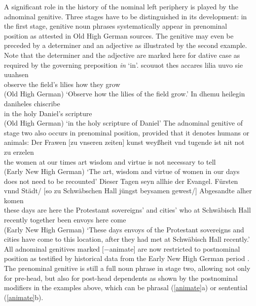 \documentclass[output=paper
                ,modfonts
                ,nonflat
	        ,collection
	        ,collectionchapter
	        ,collectiontoclongg
 	        ,biblatex
                ,babelshorthands
                ,newtxmath
                ,draftmode
                ,colorlinks, citecolor=brown
]{./langsci/langscibook}
\begin{document}
A significant role in the history of the nominal left periphery is played by the adnominal genitive. Three stages have to be distinguished in its development: in the first stage, genitive noun phrases systematically appear in prenominal position as attested in Old High German sources. The genitive may even be preceded by a determiner and an adjective as illustrated by the second example. Note that the determiner and the adjective are marked here for dative case as required by the governing preposition \textit{in} `in'.
\eal
\ex 
\gll scouuot thes accares lilia uuvo sie uuahsen \\ observe the field's lilies how they grow \\  \hfill (Old High German)
\glt `Observe how the lilies of the field grow.'
\ex 
\gll In dhemu heilegin daniheles chiscribe \\ in the holy Daniel's scripture  \\  \hfill (Old High German)
\glt `in the holy scripture of Daniel'
\zl
The adnominal genitive of stage two also occurs in prenominal position, provided that it denotes humans or animals:
\eal \label{animate}
\ex 
\gll Der Frawen [zu vnseren zeiten] kunst weyßheit vnd tugende ist nit not zu erzelen \\  the women at our times art wisdom and virtue is not necessary to tell  \\  \hfill (Early New High German)
\glt `The art, wisdom and virtue of women in our days does not need to be recounted'
\ex 
\gll Dieser Tagen seyn allhie der Evangel. Fürsten vnnd Städt/ [so zu Schwäbschen Hall jüngst beysamen gewest/] Abgesandte alher komen \\ these days are here the Protestamt sovereigns' and cities' who at Schwäbisch Hall recently together been envoys here come  \\\hfill (Early New High German)
\glt `These days envoys of the Protestant sovereigns and cities have come to this location, after they had met at Schwäbisch Hall recently.'	
\zl
All adnominal genitives marked [$-$animate] are now restricted to postnominal position as testified by historical data from the Early New High German period \citep{ebert88}. The prenominal genitive is still a full noun phrase in stage two, allowing not only for pre-head, but also for post-head dependents as shown by the postnominal modifiers in the examples above, which can be phrasal (\ref{animate}a) or sentential (\ref{animate}b).
\end{document}
